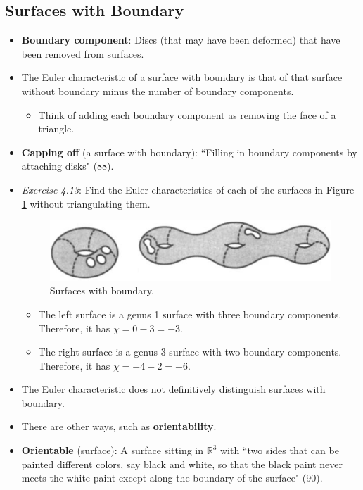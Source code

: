 \documentclass[titlepage]{article}
\numberwithin{figure}{section}
\numberwithin{table}{section}
\numberwithin{equation}{section}
\newcommand{\dq}[2]{``#1" (#2).}
\begin{document}
\subsection{Surfaces with Boundary}
\begin{itemize}
    \item \textbf{Boundary component}: Discs (that may have been deformed) that have been removed from surfaces.
    \item The Euler characteristic of a surface with boundary is that of that surface without boundary minus the number of boundary components.
    \begin{itemize}
        \item Think of adding each boundary component as removing the face of a triangle.
    \end{itemize}
    \item \textbf{Capping off} (a surface with boundary): \dq{Filling in boundary components by attaching disks}{88}
    \item \emph{Exercise 4.13}: Find the Euler characteristics of each of the surfaces in Figure \ref{fig:boundcomps} without triangulating them.
    \begin{figure}[h!]
        \centering
        \includegraphics[width=0.6\linewidth]{Blender/ex4-13.png}
        \caption{Surfaces with boundary.}
        \label{fig:boundcomps}
    \end{figure}
    \begin{itemize}
        \item The left surface is a genus 1 surface with three boundary components. Therefore, it has $\chi=0-3=-3$.
        \item The right surface is a genus 3 surface with two boundary components. Therefore, it has $\chi=-4-2=-6$.
    \end{itemize}
    \item The Euler characteristic does not definitively distinguish surfaces with boundary.
    \item There are other ways, such as \textbf{orientability}.
    \item \textbf{Orientable} (surface): A surface sitting in $\mathbb{R}^3$ with \dq{two sides that can be painted different colors, say black and white, so that the black paint never meets the white paint except along the boundary of the surface}{90}

\end{itemize}
\end{document}

